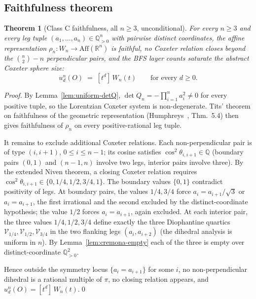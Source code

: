 \documentclass[11pt,a4paper]{article}
\newtheorem{theorem}{Theorem}
\theoremstyle{remark}
\theoremstyle{plain}
\begin{document}
\subsection{Faithfulness theorem}

\begin{theorem}[Class C faithfulness, all $n \ge 3$, unconditional]
\label{thm:master-C-uncond}
For every $n \ge 3$ and every leg tuple $(a_1, \ldots, a_n) \in
\mathbb{Q}_{>0}^n$ with pairwise distinct coordinates, the affine
representation $\rho_n : W_n \to \mathrm{Aff}(\mathbb{R}^n)$ is
faithful, no Coxeter relation closes beyond the
$\binom{n}{2} - n$ perpendicular pairs, and the BFS layer counts
saturate the abstract Coxeter sphere size:
\[
u_d^n(O) \;=\; [t^d]\, W_n(t)
\qquad \text{for every } d \ge 0.
\]
\end{theorem}

\begin{proof}
By Lemma~\ref{lem:uniform-detQ}, $\det Q_n = -\prod_{i=1}^n a_i^2 \ne 0$
for every positive tuple, so the Lorentzian Coxeter system is
non-degenerate.  Tits' theorem on faithfulness of the geometric
representation (Humphreys~\cite{humphreys90}, Thm.~5.4) then gives
faithfulness of $\rho_n$ on every positive-rational leg tuple.

It remains to exclude additional Coxeter relations.  Each
non-perpendicular pair is of type $(i, i+1)$, $0 \le i \le n-1$;
its cosine satisfies $\cos^2 \theta_{i, i+1} \in \mathbb{Q}$
(boundary pairs $(0,1)$ and $(n-1,n)$ involve two legs, interior
pairs involve three).  By the extended Niven theorem, a closing
Coxeter relation requires
$\cos^2 \theta_{i, i+1} \in \{0, 1/4, 1/2, 3/4, 1\}$.  The boundary
values $\{0, 1\}$ contradict positivity of legs.  At boundary pairs,
the values $1/4, 3/4$ force $a_i = a_{i+1}/\sqrt 3$ or
$a_i = a_{i+1}$, the first irrational and the second excluded by
the distinct-coordinate hypothesis; the value $1/2$ forces
$a_i = a_{i+1}$, again excluded.  At each interior pair, the three
values $1/4, 1/2, 3/4$ define exactly the three Diophantine
quartics $\mathcal{V}_{1/4}, \mathcal{V}_{1/2}, \mathcal{V}_{3/4}$
in the two flanking legs $(a_i, a_{i+2})$ (the dihedral analysis is
uniform in $n$).  By Lemma~\ref{lem:cremona-empty} each of the
three is empty over distinct-coordinate $\mathbb{Q}_{>0}^2$.

Hence outside the symmetry locus $\{a_i = a_{i+1}\}$ for some $i$,
no non-perpendicular dihedral is a rational multiple of $\pi$, no
closing relation appears, and $u_d^n(O) = [t^d]\, W_n(t)$.\qed
\end{proof}
\end{document}

